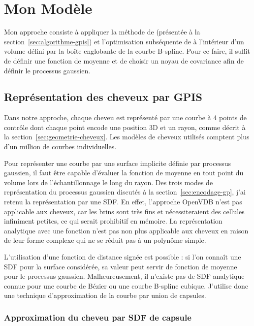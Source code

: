 \section{Mon Modèle}
\label{sec:mon-modele}

Mon approche consiste à appliquer la méthode de \textcite{seyb24from} (présentée à la section~\ref{sec:algorithme-gpis}) et l'optimisation subséquente de \textcite{xu25practical} à l'intérieur d'un volume défini par la boîte englobante de la courbe B-spline. Pour ce faire, il suffit de définir une fonction de moyenne et de choisir un noyau de covariance afin de définir le processus gaussien.

\subsection{Représentation des cheveux par GPIS}

Dans notre approche, chaque cheveu est représenté par une courbe à 4 points de contrôle dont chaque point encode une position 3D et un rayon, comme décrit à la section~\ref{sec:geometrie-cheveux}. Les modèles de cheveux utilisés comptent plus d'un million de courbes individuelles.

Pour représenter une courbe par une surface implicite définie par processus gaussien, il faut être capable d'évaluer la fonction de moyenne en tout point du volume lors de l'échantillonnage le long du rayon.
Des trois modes de représentation du processus gaussien discutés à la section~\ref{sec:encodage-gp}, j'ai retenu la représentation par une SDF. En effet, l'approche OpenVDB n'est pas applicable aux cheveux, car les brins sont très fins et nécessiteraient des cellules infiniment petites, ce qui serait prohibitif en mémoire. La représentation analytique avec une fonction n'est pas non plus applicable aux cheveux en raison de leur forme complexe qui ne se réduit pas à un polynôme simple.

L'utilisation d'une fonction de distance signée est possible : si l'on connaît une SDF pour la surface considérée, sa valeur peut servir de fonction de moyenne pour le processus gaussien. Malheureusement, il n'existe pas de SDF analytique connue pour une courbe de Bézier ou une courbe B-spline cubique. J'utilise donc une technique d'approximation de la courbe par union de capsules.

\subsubsection{Approximation du cheveu par SDF de capsule}

